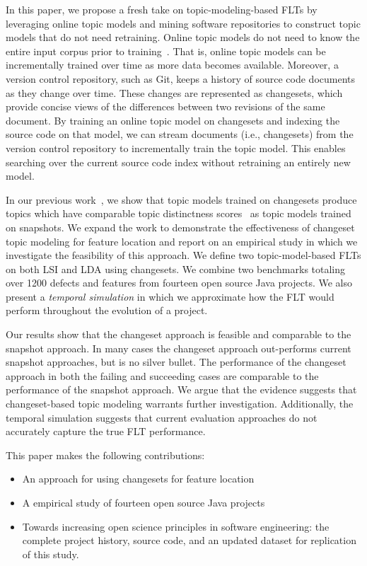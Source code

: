 In this paper, we propose a fresh take on topic-modeling-based FLTs by leveraging online topic models and mining software repositories to construct topic models that do not need retraining.
Online topic models do not need to know the entire input corpus prior to training~\cite{Hoffman-etal:2010,Radim:2011}.
That is, online topic models can be incrementally trained over time as more data becomes available.
Moreover, a version control repository, such as Git, keeps a history of source code documents as they change over time.
These changes are represented as changesets, which provide concise views of the differences between two revisions of the same document.
By training an online topic model on changesets and indexing the source code on that model, we can stream documents (i.e., changesets) from the version control repository to incrementally train the topic model.
This enables searching over the current source code index without retraining an entirely new model.

In our previous work~\cite{Corley-etal:2014}, we show that topic models trained on changesets produce topics which have comparable
topic distinctness scores~\cite{Thomas-etal:2011} as topic models trained on snapshots.
We expand the work to demonstrate the effectiveness of changeset topic modeling for feature location and report on an empirical study in which we investigate the feasibility of this approach.
We define two topic-model-based FLTs on both LSI and LDA using changesets.
We combine two benchmarks totaling over 1200 defects and features from fourteen open source Java projects.
We also present a \emph{temporal simulation} in which we approximate how the FLT would perform throughout the evolution of a project.

Our results show that the changeset approach is feasible and comparable to the snapshot approach.
In many cases the changeset approach out-performs current snapshot approaches, but is no silver bullet.
The performance of the changeset approach in both the failing and succeeding cases are comparable to the performance of the snapshot approach.
We argue that the evidence suggests that changeset-based topic modeling warrants further investigation.
Additionally, the temporal simulation suggests that current evaluation approaches do not accurately capture the true FLT performance.

This paper makes the following contributions:

\begin{itemize}
    \item An approach for using changesets for feature location
    \item A empirical study of fourteen open source Java projects
    \item Towards increasing open science principles in software engineering:
        the complete project history, source code, and an updated dataset for
        replication of this study.
\end{itemize}

